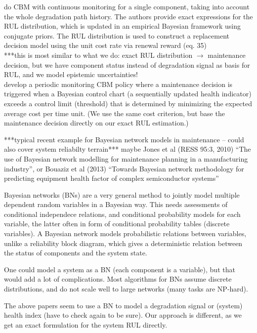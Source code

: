 \documentclass[authoryear]{elsarticle}
\begin{document}
\cite{2013:si-et-al} do CBM with continuous monitoring for a single component,
taking into account the whole degradation path history.
The authors provide exact expressions for the RUL distribution, which is updated in an empirical Bayesian framework using conjugate priors.
The RUL distribution is used to construct a replacement decision model using the unit cost rate via renewal reward
(eq. 35)\\
***this is most similar to what we do: exact RUL distribution $\to$ maintenance decision,
but we have component status instead of degradation signal as basis for RUL,
and we model epistemic uncertainties!\\

\cite{2011:kim-et-al} develop a periodic monitoring CBM policy
where a maintenance decision is triggered when
a Bayesian control chart (a sequentially updated health indicator) %
exceeds a control limit (threshold) that is determined
by minimizing the expected average cost per time unit.
(We use the same cost criterion, but base the maintenance decision directly on our exact RUL estimation.)

***typical recent example for Bayesian network models in maintenance -- could also cover system reliabilty terrain***
maybe Jones et al (RESS 95:3, 2010) ``The use of Bayesian network modelling for maintenance planning in a manufacturing industry'',
or Bouaziz et al (2013) ``Towards Bayesian network methodology for predicting equipment health factor of complex semiconductor systems''

\begin{scriptsize}
Bayesian networks (BNs) are a very general method to jointly model multiple dependent random variables in a Bayesian way. 
This needs assessments of conditional independece relations, and conditional probability models for each variable,
the latter often in form of conditional probability tables (discrete variables).
A Bayesian network models probabilistic relations between variables,
unlike a reliability block diagram, which gives a deterministic relation
between the status of components and the system state.

One could model a system as a BN (each component is a variable),
but that would add a lot of complications.
Most algorithms for BNs assume discrete distributions,
and do not scale well to large networks (many tasks are NP-hard).

The above papers seem to use a BN to model a degradation signal or (system) health index (have to check again to be sure).
Our approach is different, as we get an exact formulation for the system RUL directly.

\end{scriptsize}
\end{document}

